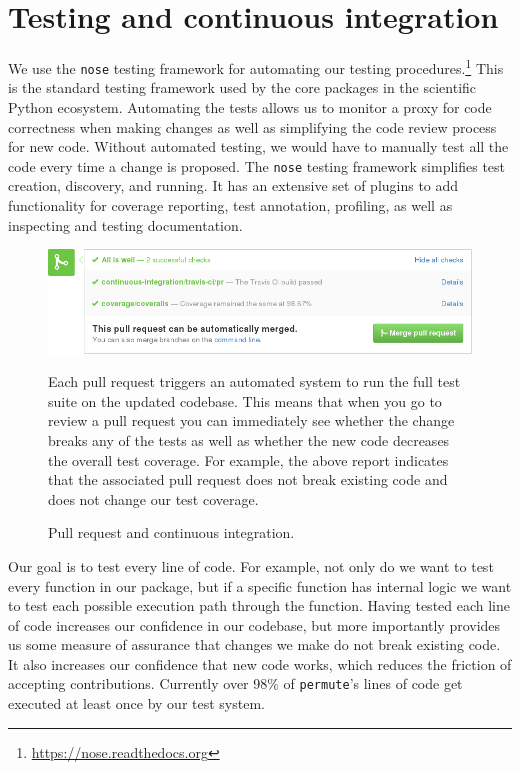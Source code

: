 \section{\label{sec:test}Testing and continuous integration}

We use the \texttt{nose} testing framework for automating our testing
procedures.\footnote{\url{https://nose.readthedocs.org}}  This is the standard
testing framework used by the core packages in the scientific Python ecosystem.
Automating the tests allows us to monitor a proxy for code correctness when
making changes as well as simplifying the code review process for new code.
Without automated testing, we would have to manually test all the code every
time a change is proposed.  The \texttt{nose} testing framework simplifies test
creation, discovery, and running. It has an extensive set of plugins to add
functionality for coverage reporting, test annotation, profiling, as well as
inspecting and testing documentation.

\begin{figure}
  \begin{centering}
    \includegraphics[width=\textwidth]{fig/pull-request-ci.png}\par
  \end{centering}

  \caption{\label{fig:pull-request}Pull request and continuous integration.}
\setlength{\leftskip}{1cm}
\setlength{\rightskip}{1cm}
\small
Each pull request triggers an automated system to run the  full test suite on
the updated codebase.
This means that when you go to review a pull request you can immediately see
whether the change breaks any of the tests as well as whether the new
code decreases the overall test coverage.
For example, the above report indicates that the associated pull request does not
break existing code and does not change our test coverage.
\end{figure}

Our goal is to test every line of code.  For example, not only do we want to
test every function in our package, but if a specific function has internal
logic we want to test each possible execution path through the function.
Having tested each line of code increases our confidence in our codebase, but
more importantly provides us some measure of assurance that changes we make do
not break existing code.  It also increases our confidence that new code works,
which reduces the friction of accepting contributions.  Currently over 98\% of
\texttt{permute}'s lines of code get executed at least once by our test system.

